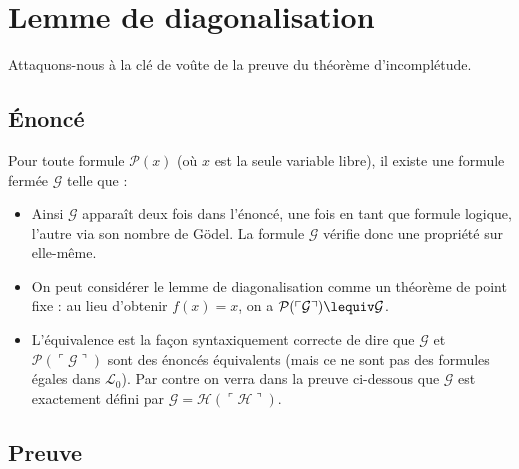 \documentclass[11pt,class=report,crop=false]{standalone}
\begin{document}
\section{Lemme de diagonalisation}

Attaquons-nous à la clé de voûte de la preuve du théorème d'incomplétude.

\subsection{Énoncé}

\begin{lemme}[de diagonalisation]
    Pour toute formule $\mathcal{P}(x)$ (où $x$ est la seule variable libre), il existe une formule fermée $\mathcal{G}$ telle que :
\end{lemme}

\begin{itemize}
    \item Ainsi $\mathcal{G}$ apparaît deux fois dans l'énoncé, une fois en tant que formule logique, l'autre via son nombre de Gödel.
    La formule $\mathcal{G}$ vérifie donc une propriété sur elle-même.

    \item On peut considérer le lemme de diagonalisation comme un théorème de point fixe : au lieu d'obtenir $f(x)=x$, on a $\mathcal{P}({\ulcorner \mathcal{G} \urcorner}) \lequiv \mathcal{G}$. 

    \item L'équivalence est la façon syntaxiquement correcte de dire que $\mathcal{G}$ et $\mathcal{P}({\ulcorner \mathcal{G} \urcorner})$ sont des énoncés équivalents (mais ce ne sont pas des formules égales dans $\mathcal{L}_0$). Par contre on verra dans la preuve ci-dessous que $\mathcal{G}$ est exactement défini par $\mathcal{G} = \mathcal{H}({\ulcorner \mathcal{H} \urcorner})$.
\end{itemize}

\subsection{Preuve}
\end{document}
